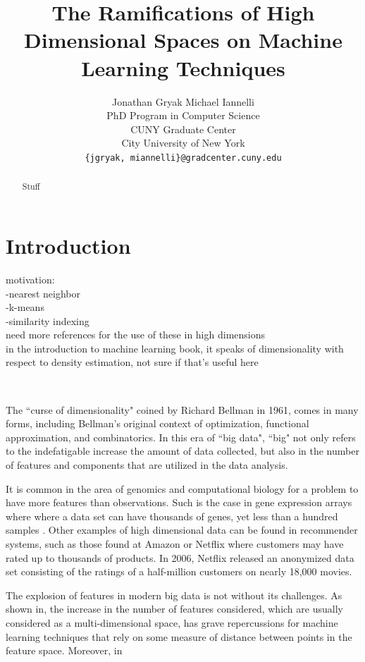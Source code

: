 \documentclass{article}
\title{The Ramifications of High Dimensional Spaces on Machine Learning Techniques}
\author{Jonathan Gryak
\qquad
Michael Iannelli\\
PhD Program in Computer Science\\
CUNY Graduate Center\\
City University of New York\\
\texttt{\{jgryak, miannelli\}@gradcenter.cuny.edu}}
\date{}
\begin{document}
\maketitle

\begin{abstract}
Stuff
\end{abstract}
\tableofcontents
\section{Introduction}
motivation:\\
-nearest neighbor\\
-k-means\\
-similarity indexing\\
need more references for the use of these in high dimensions\\
in the introduction to machine learning book, it speaks of dimensionality with respect to density estimation,
not sure if that's useful here

\

The ``curse of dimensionality" coined by Richard Bellman in 1961\cite{bellman1961adaptive}, comes in many forms, including Bellman's original context of optimization, functional approximation, and combinatorics. In this era of ``big data", ``big" not only refers to the indefatigable increase the amount of data collected, but also in the number of features and components that are utilized in the data analysis.  

It is common in the area of genomics and computational biology for a problem to have more features than observations.  Such is the case in gene expression arrays where where a data set can have thousands of genes, yet less than a hundred samples \cite{hastie01statisticallearning}.  Other examples of high dimensional data can be found in recommender systems, such as those found at Amazon or Netflix where customers may have rated up to thousands of products.  In 2006, Netflix released an anonymized data set consisting of the ratings of a half-million customers on nearly 18,000 movies\cite{Bennett:2007:KCW:1345448.1345459}.

The explosion of features in modern big data is not without its challenges.  As shown in\cite{aggarwal2001surprising}, the increase in the number of features considered, which are usually considered as a multi-dimensional space, has grave repercussions for machine learning techniques that rely on some measure of distance between points in the feature space. Moreover, in 
\end{document}
